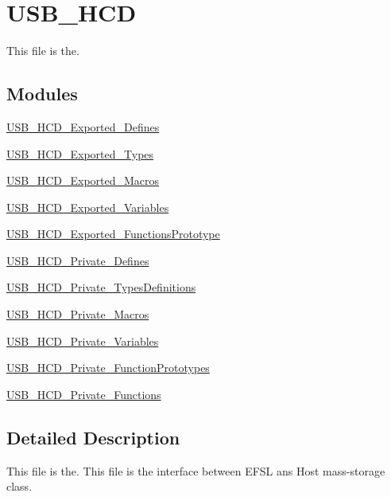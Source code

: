 \hypertarget{group___u_s_b___h_c_d}{\section{U\-S\-B\-\_\-\-H\-C\-D}
\label{group___u_s_b___h_c_d}
}


This file is the.  


\subsection*{Modules}
\begin{DoxyCompactItemize}
\item 
\hyperlink{group___u_s_b___h_c_d___exported___defines}{U\-S\-B\-\_\-\-H\-C\-D\-\_\-\-Exported\-\_\-\-Defines}
\item 
\hyperlink{group___u_s_b___h_c_d___exported___types}{U\-S\-B\-\_\-\-H\-C\-D\-\_\-\-Exported\-\_\-\-Types}
\item 
\hyperlink{group___u_s_b___h_c_d___exported___macros}{U\-S\-B\-\_\-\-H\-C\-D\-\_\-\-Exported\-\_\-\-Macros}
\item 
\hyperlink{group___u_s_b___h_c_d___exported___variables}{U\-S\-B\-\_\-\-H\-C\-D\-\_\-\-Exported\-\_\-\-Variables}
\item 
\hyperlink{group___u_s_b___h_c_d___exported___functions_prototype}{U\-S\-B\-\_\-\-H\-C\-D\-\_\-\-Exported\-\_\-\-Functions\-Prototype}
\item 
\hyperlink{group___u_s_b___h_c_d___private___defines}{U\-S\-B\-\_\-\-H\-C\-D\-\_\-\-Private\-\_\-\-Defines}
\item 
\hyperlink{group___u_s_b___h_c_d___private___types_definitions}{U\-S\-B\-\_\-\-H\-C\-D\-\_\-\-Private\-\_\-\-Types\-Definitions}
\item 
\hyperlink{group___u_s_b___h_c_d___private___macros}{U\-S\-B\-\_\-\-H\-C\-D\-\_\-\-Private\-\_\-\-Macros}
\item 
\hyperlink{group___u_s_b___h_c_d___private___variables}{U\-S\-B\-\_\-\-H\-C\-D\-\_\-\-Private\-\_\-\-Variables}
\item 
\hyperlink{group___u_s_b___h_c_d___private___function_prototypes}{U\-S\-B\-\_\-\-H\-C\-D\-\_\-\-Private\-\_\-\-Function\-Prototypes}
\item 
\hyperlink{group___u_s_b___h_c_d___private___functions}{U\-S\-B\-\_\-\-H\-C\-D\-\_\-\-Private\-\_\-\-Functions}
\end{DoxyCompactItemize}


\subsection{Detailed Description}
This file is the. This file is the interface between E\-F\-S\-L ans Host mass-\/storage class.